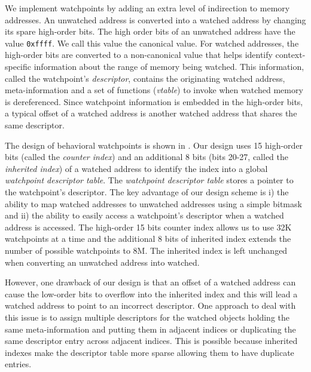 We implement watchpoints by adding an extra level of indirection to memory addresses. An unwatched address is converted into a watched address by changing its spare high-order bits. The high order bits of an unwatched address have the value \texttt{0xffff}. We call this value the canonical value. For watched addresses, the high-order bits are converted to a non-canonical value that helps identify context-specific information about the range of memory being watched. This information, called the watchpoint's \emph{descriptor}, contains the originating watched address, meta-information and a set of functions (\emph{vtable}) to invoke when watched memory is dereferenced. Since watchpoint information is embedded in the high-order bits, a typical offset of a watched address is another watched address that shares the same descriptor. 

The design of behavioral watchpoints is shown in . Our design uses 15 high-order bits (called the \emph{counter index}) and an additional 8 bits (bits 20-27, called the \emph{inherited index}) of a watched address to identify the index into a global \emph{watchpoint descriptor table}. The \emph{watchpoint descriptor table} stores a pointer to the watchpoint's descriptor. The key advantage of our design scheme is i) the ability to map watched addresses to unwatched addresses using a simple bitmask and  ii) the ability to easily access a watchpoint's descriptor when a watched address is accessed. The high-order 15 bits counter index allows us to use 32K watchpoints at a time and the additional 8 bits of inherited index extends the number of possible watchpoints to 8M. The inherited index is left unchanged when converting an unwatched address into watched.

However, one drawback of our design is that an offset of a watched address can cause the low-order bits to overflow into the inherited index and this will lead a watched address to point to an incorrect descriptor. One approach to deal with this issue is to assign  multiple descriptors for the watched objects holding the same meta-information and putting them in adjacent indices or duplicating the same descriptor entry across adjacent indices. This is possible because inherited indexes make the descriptor table more sparse allowing them to have duplicate entries.




